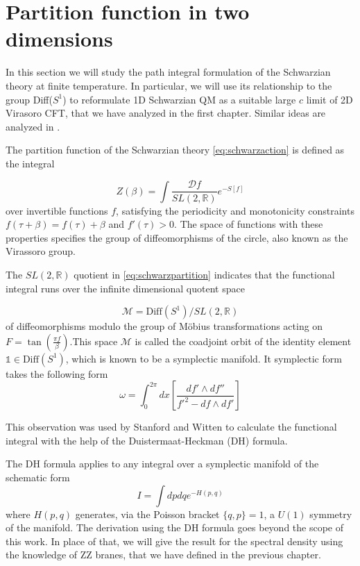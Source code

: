 \chapter{Partition function in two dimensions}
\adjustmtc
\minitoc
In this section we will study the path integral formulation of the Schwarzian theory at finite temperature. In particular, we will use its relationship to the group Diff($S^1$) to reformulate 1D Schwarzian QM as a suitable large $c$ limit of 2D Virasoro CFT, that we have analyzed in the first chapter. Similar ideas are analyzed in \cite{Mandal17}.
\par
The partition function of the Schwarzian theory \eqref{eq:schwarzaction} is defined as the integral

\begin{equation}
Z(\beta) = \int\frac{\mathcal{D}f}{SL(2,\mathbb{R})}e^{-S[f]}
\label{eq:schwarzpartition}
\end{equation}
over invertible functions $f$, satisfying the periodicity and monotonicity constraints $f(\tau+\beta) = f(\tau)+\beta$ and $f'(\tau)> 0$. The space of functions with these properties specifies the group of diffeomorphisms of the circle, also known as the Virassoro group.
\par
The $SL(2,\mathbb{R})$ quotient in \eqref{eq:schwarzpartition} indicates that the functional integral runs over the infinite dimensional quotent space

\begin{equation}
\mathcal{M} = \text{Diff}(S^1)/SL(2,\mathbb{R})
\end{equation}
of diffeomorphisms modulo the group of Möbius transformations acting on $F=\tan(\frac{\pi f}{\beta})$.This space $ \mathcal{M} $ is called the coadjoint orbit of the identity element $\mathbb{1}\in\text{Diff}(S^1)$, which is known to be a symplectic manifold\cite{Kirilov81}. It symplectic form takes the following form
\begin{equation}
\omega = \int_0^{2\pi}dx\left[\frac{df'\wedge df''}{f'^2 - df\wedge df'}\right]
\end{equation}

This observation was used by Stanford and Witten \cite{Witten17} to calculate the functional integral with the help of the Duistermaat-Heckman (DH) formula\cite{Duistermaat82}.
\par
The DH formula applies to any integral over a symplectic manifold of the schematic form
\begin{equation}
I = \int dpdq e^{-H(p,q)}
\end{equation}
where $H(p,q)$ generates, via the Poisson bracket $\{q,p\} = 1$, a $U(1)$ symmetry of the manifold. The derivation using the DH formula goes beyond the scope of this work. In place of that, we will give the result for the spectral density using the knowledge of ZZ branes, that we have defined in the previous chapter.
